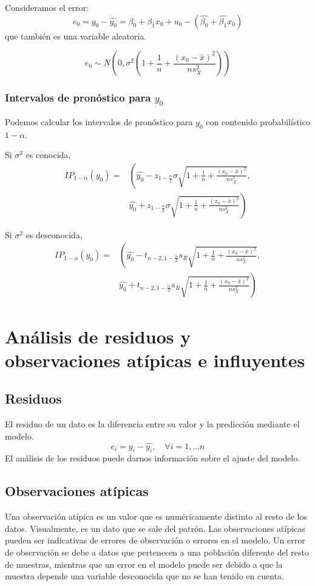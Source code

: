 Consideramos el error:
$$e_0 = y_0 - \hat{y_0} = \beta_0 + \beta_1x_0 + u_0 - (\hat{\beta_0} + \hat{\beta_1}x_0)$$
que también es una variable aleatoria.

\begin{theorem}
    $$e_0 \sim N\left( 0, \sigma^2 \left(1+\frac{1}{n}+\frac{(x_0-\bar{x})^2}{ns_X^2} \right) \right)$$
\end{theorem}

\subsubsection*{Intervalos de pronóstico para $y_0$}
Podemos calcular los intervalos de pronóstico para $y_0$ con contenido probabilístico $1-\alpha$.

Si $\sigma^2$ es conocida,
\begin{align*}
    IP_{1-\alpha}(y_0) = & \left( \hat{y_0} - z_{1-\frac{\alpha}{2}} \sigma \sqrt{1 + \frac{1}{n} + \frac{(x_0-\bar{x})^2}{ns_X^2}}, \right. \\
                         & \left. \hat{y_0} + z_{1-\frac{\alpha}{2}} \sigma \sqrt{1 + \frac{1}{n} + \frac{(x_0-\bar{x})^2}{ns_X^2}} \right)
\end{align*}

Si $\sigma^2$ es desconocida,
\begin{align*}
    IP_{1-\alpha}(y_0) = & \left( \hat{y_0} - t_{n-2, 1-\frac{\alpha}{2}} s_R \sqrt{1 + \frac{1}{n} + \frac{(x_0-\bar{x})^2}{ns_X^2}}, \right. \\
    & \left. \hat{y_0} + t_{n-2, 1-\frac{\alpha}{2}} s_R \sqrt{1 + \frac{1}{n} + \frac{(x_0-\bar{x})^2}{ns_X^2}} \right)
\end{align*}

\section{Análisis de residuos y observaciones atípicas e influyentes}
\subsection*{Residuos}
El residuo de un dato es la diferencia entre su valor y la predicción mediante el modelo.
$$e_i = y_i - \hat{y_i}, \quad \forall i = 1, \dots n$$
El análisis de los residuos puede darnos información sobre el ajuste del modelo.

\subsection*{Observaciones atípicas}
Una observación atípica es un valor que es numéricamente distinto al resto de los datos.
Visualmente, es un dato que se sale del patrón.
Las observaciones atípicas pueden ser indicativas de errores de observación o errores en el modelo.
Un error de observación se debe a datos que pertenecen a una población diferente del resto de muestras, mientras que un error en el modelo puede ser debido a que la muestra depende una variable desconocida que no se han tenido en cuenta.

